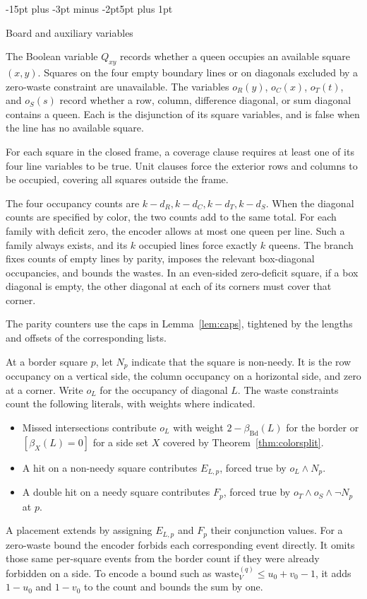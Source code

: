 \documentclass[11pt,a4paper]{article}
\makeatletter
\renewcommand{\subsection}{\@startsection{subsection}{2}{\z@}%
  {-15pt plus -3pt minus -2pt}{5pt plus 1pt}%
  {\normalfont\bfseries\raggedright}}
\theoremstyle{result}
\theoremstyle{definition}
\theoremstyle{remark}
\newcommand{\waste}{\mathrm{waste}}
\newcommand{\Bd}{\mathrm{Bd}}
\makeatother
\begin{document}
\subsection{Board and auxiliary variables}

The Boolean variable $Q_{xy}$ records whether a queen occupies an
available square $(x,y)$. Squares on the four empty boundary lines
or on diagonals excluded by a zero-waste constraint are unavailable.
The variables $o_R(y)$, $o_C(x)$, $o_T(t)$, and $o_S(s)$ record
whether a row, column, difference diagonal, or sum diagonal contains
a queen. Each is the disjunction of its square variables, and is
false when the line has no available square.

For each square in the closed frame, a coverage clause requires
at least one of its four line variables to be true. Unit clauses
force the exterior rows and columns to be occupied, covering all
squares outside the frame.

The four occupancy counts are $k-d_R,k-d_C,k-d_T,k-d_S$. When
the diagonal counts are specified by color, the two counts add to
the same total. For each family with deficit zero, the encoder
allows at most one queen per line. Such a family always exists,
and its $k$ occupied lines force exactly $k$ queens.
The branch fixes counts of empty lines by parity, imposes
the relevant box-diagonal occupancies, and bounds the wastes.
In an even-sided zero-deficit square, if a box diagonal is empty,
the other diagonal at each of its corners must cover that corner.

The parity counters use the caps in Lemma~\ref{lem:caps}, tightened
by the lengths and offsets of the corresponding lists.

At a border square $p$, let $N_p$ indicate that the square is
non-needy. It is the row occupancy on a vertical side, the column
occupancy on a horizontal side, and zero at a corner. Write $o_L$
for the occupancy of diagonal $L$. The waste constraints count
the following literals, with weights where indicated.
\begin{itemize}[leftmargin=1.8em,itemsep=2pt]
  \item Missed intersections contribute $o_L$ with weight
    $2-\beta_{\Bd}(L)$ for the border or $[\beta_X(L)=0]$
    for a side set $X$ covered by Theorem~\ref{thm:colorsplit}.
  \item A hit on a non-needy square contributes $E_{L,p}$,
    forced true by $o_L\land N_p$.
  \item A double hit on a needy square contributes $F_p$, forced
    true by $o_T\land o_S\land\neg N_p$ at $p$.
\end{itemize}
A placement extends by assigning $E_{L,p}$ and $F_p$ their
conjunction values. For a zero-waste bound the encoder forbids
each corresponding event directly. It omits those same per-square
events from the border count if they were already forbidden on a
side. To encode a bound such as $\waste_V^{(q)}\le u_0+v_0-1$,
it adds $1-u_0$ and $1-v_0$ to the count and bounds the sum by one.
\end{document}
